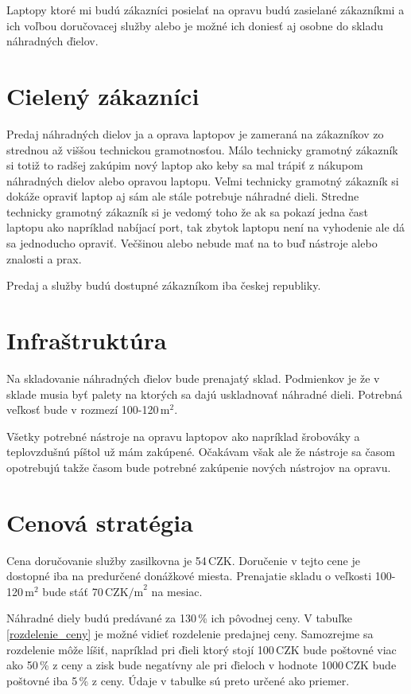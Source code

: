 Laptopy ktoré mi budú zákazníci posielať na opravu budú zasielané zákazníkmi a ich voľbou doručovacej služby alebo je možné ich doniesť aj osobne do skladu náhradných ďielov.

\section{Cielený zákazníci}

Predaj náhradných dielov ja a oprava laptopov je zameraná na zákazníkov zo strednou až viššou technickou gramotnosťou. Málo technicky gramotný zákazník si totiž to radšej zakúpim nový laptop ako keby sa mal trápiť z nákupom náhradných dielov alebo opravou laptopu. Veľmi technicky gramotný zákazník si dokáže opraviť laptop aj sám ale stále potrebuje náhradné dieli. Stredne technicky gramotný zákazník si je vedomý toho že ak sa pokazí jedna čast laptopu ako napríklad nabíjací port, tak zbytok laptopu není na vyhodenie ale dá sa jednoducho opraviť. Večšinou alebo nebude mať na to buď nástroje alebo znalosti a prax.

Predaj a služby budú dostupné zákazníkom iba českej republiky.

\section{Infraštruktúra}

Na skladovanie náhradných ďielov bude prenajatý sklad. Podmienkov je že v sklade musia byť palety na ktorých sa dajú uskladnovať náhradné dieli. Potrebná veľkosť bude v rozmezí 100-120\,$\mathrm{m}^2$.

Všetky potrebné nástroje na opravu laptopov ako napríklad šrobováky a teplovzdušnú píštol už mám zakúpené. Očakávam však ale že nástroje sa časom opotrebujú takže časom bude potrebné zakúpenie nových nástrojov na opravu.

\section{Cenová stratégia}

Cena doručovanie služby zasilkovna je 54\,CZK. Doručenie v tejto cene je dostopné iba na predurčené donážkové miesta. Prenajatie skladu o veľkosti 100-120\,$\mathrm{m}^2$ bude stáť 70\,$\mathrm{CZK/m}^2$ na mesiac.

Náhradné diely budú predávané za 130\,\% ich pôvodnej ceny. V tabuľke \ref{rozdelenie_ceny} je možné vidieť rozdelenie predajnej ceny. Samozrejme sa rozdelenie môže líšiť, napríklad pri ďieli ktorý stojí 100\,CZK bude poštovné viac ako 50\,\% z ceny a zisk bude negatívny ale pri ďieloch v hodnote 1000\,CZK bude poštovné iba 5\,\% z ceny. Údaje v tabulke sú preto určené ako priemer.


